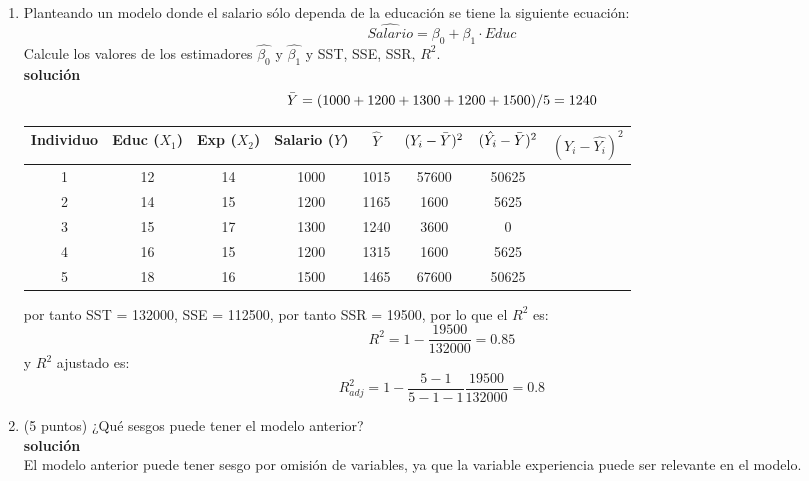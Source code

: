 \documentclass[10pt,a4paper]{article}
\begin{document}
\begin{enumerate}
\begin{enumerate}
\begin{enumerate}
    \item Planteando un modelo donde el salario sólo dependa de la educación se tiene la siguiente ecuación:
    $$\widehat{Salario} = \beta_0 + \beta_1 \cdot Educ$$
    Calcule los valores de los estimadores $\hat{\beta_0}$ y $\hat{\beta_1}$ y SST, SSE, SSR, $R^2$.
    \\
    \textbf{solución}
    \\
    $$\Bar{Y}=(1000+1200+1300+1200+1500)/5 = 1240$$
\begin{center}
\begin{tabular}{|c|c|c|c|c|c|c|c|}
\hline
\textbf{Individuo} & \textbf{Educ} ($X_1$) & \textbf{Exp} ($X_2$)  & \textbf{Salario ($Y$)} & $\hat{Y}$ & $(Y_i - \Bar{Y})^2$ & $(\hat{Y_i} - \Bar{Y})^2$ & $(Y_i-\hat{Y_i})^2$\\
\hline
1 & 12 & 14 & 1000 & 1015 & 57600 & 50625& \\
2 & 14 & 15 & 1200 & 1165 & 1600  & 5625& \\
3 & 15 & 17 & 1300 & 1240 & 3600  & 0& \\
4 & 16 & 15 & 1200 & 1315 & 1600  & 5625& \\
5 & 18 & 16 & 1500 & 1465 & 67600 & 50625& \\
\hline
\end{tabular}
\end{center}
por tanto SST = 132000, SSE = 112500, por tanto SSR = 19500, por lo que el $R^2$ es:
$$R^2 = 1- \frac{19500}{132000} = 0.85$$
y $R^2$ ajustado es:
$$R^2_{adj} = 1-\frac{5-1}{5-1-1}\frac{19500}{132000} = 0.8$$

    \item (5 puntos) ¿Qué sesgos puede tener el modelo anterior?
    \\
    \textbf{solución}
    \\
    El modelo anterior puede tener sesgo por omisión de variables, ya que la variable experiencia puede ser relevante en el modelo.
    \\


\end{enumerate}
\end{enumerate}
\end{enumerate}
\end{document}
